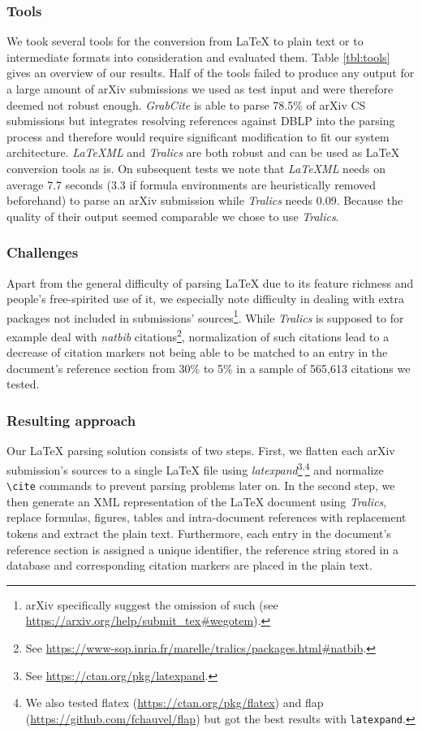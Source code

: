 \subsubsection{Tools}
We took several tools for the conversion from \LaTeX{} to plain text or to intermediate formats into consideration and evaluated them. Table \ref{tbl:tools} gives an overview of our results. Half of the tools failed to produce any output for a large amount of arXiv submissions we used as test input and were therefore deemed not robust enough. \textit{GrabCite} is able to parse 78.5\% of arXiv CS submissions but integrates resolving references against DBLP into the parsing process and therefore would require significant modification to fit our system architecture. \textit{LaTeXML} and \textit{Tralics} are both robust and can be used as \LaTeX{} conversion tools as is. On subsequent tests we note that \textit{LaTeXML} needs on average 7.7 seconds (3.3 if formula environments are heuristically removed beforehand) to parse an arXiv submission while \textit{Tralics} needs 0.09. Because the quality of their output seemed comparable we chose to use \textit{Tralics}.


\subsubsection{Challenges}
Apart from the general difficulty of parsing \LaTeX{} due to its feature richness and people's free-spirited use of it, we especially note difficulty in dealing with extra packages not included in submissions' sources\footnote{arXiv specifically suggest the omission of such (see \url{https://arxiv.org/help/submit\_tex\#wegotem}).}. While \textit{Tralics} is supposed to for example deal with \textit{natbib} citations\footnote{See \url{https://www-sop.inria.fr/marelle/tralics/packages.html\#natbib}.}, normalization of such citations lead to a decrease of citation markers not being able to be matched to an entry in the document's reference section from 30\% to 5\% in a sample of 565,613 citations we tested.


\subsubsection{Resulting approach}
Our \LaTeX{} parsing solution consists of two steps. First, we flatten each arXiv submission's sources to a single \LaTeX{} file using \textit{latexpand}\footnote{See \url{https://ctan.org/pkg/latexpand}.}\textsuperscript{,}\footnote{We also tested flatex (\url{https://ctan.org/pkg/flatex}) and flap (\url{https://github.com/fchauvel/flap}) but got the best results with \texttt{latexpand}.} and normalize \texttt{\textbackslash cite} commands to prevent parsing problems later on. In the second step, we then generate an XML representation of the \LaTeX{} document using \textit{Tralics}, replace formulas, figures, tables and intra-document references with replacement tokens and extract the plain text. Furthermore, each entry in the document's reference section is assigned a unique identifier, the reference string stored in a database and corresponding citation markers are placed in the plain text.

